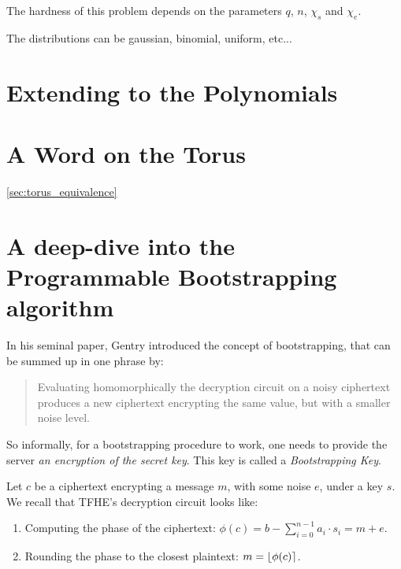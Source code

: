The  hardness of this problem depends on the parameters $q$, $n$, $\chi_s$ and $\chi_e$. 


The distributions can be gaussian, binomial, uniform, etc...







\section{Extending to the Polynomials}



\section{A Word on the Torus}
\ref{sec:torus_equivalence}












\section{A deep-dive into the Programmable Bootstrapping algorithm}

In his seminal paper, Gentry introduced the concept of bootstrapping, that can be summed up in one phrase by:

\begin{quote}
	Evaluating homomorphically the decryption circuit on a noisy ciphertext produces a new ciphertext encrypting the same value, but with a smaller noise level.
\end{quote}

So informally, for a bootstrapping procedure to work, one needs to provide the server \textit{an encryption of the secret key}. This key is called a \textit{Bootstrapping Key}.



Let $c$ be a ciphertext encrypting a message $m$, with some noise $e$, under a key $s$. We recall that TFHE's decryption circuit looks like:

\begin{enumerate}
	\item Computing the phase of the ciphertext: $\phi(c) = b - \sum_{i=0}^{n-1} a_i \cdot s_i = m + e$.
	\item Rounding the phase to the closest plaintext: $m = \left \lfloor \phi(c) \right \rceil$.
\end{enumerate}



